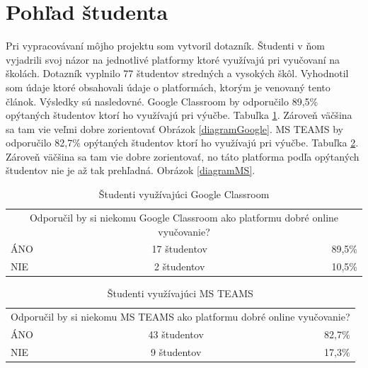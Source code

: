 \documentclass[10pt,slovak,a4paper]{article}
\begin{document}
\section{Pohľad študenta} \label{pohľad studenta}
Pri vypracovávaní môjho projektu som vytvoril dotazník. Študenti v ňom vyjadrili svoj názor na jednotlivé platformy ktoré využívajú pri vyučovaní na školách. Dotazník vyplnilo 77 študentov stredných a vysokých škôl. Vyhodnotil som údaje ktoré obsahovali údaje o platformách, ktorým je venovaný tento článok. Výsledky sú nasledovné. Google Classroom by odporučilo 89,5\% opýtaných študentov ktorí ho využívajú pri výučbe. Tabuľka \ref{tab:tabulkaGoogle}. Zároveň väčšina sa tam vie veľmi dobre zorientovať Obrázok \ref{diagramGoogle}. MS TEAMS by odporučilo 82,7\% opýtaných študentov ktorí ho využívajú pri výučbe. Tabuľka \ref{tab:tabulkaMS}. Zároveň väčšina sa tam vie dobre zorientovať, no táto platforma podľa opýtaných študentov nie je až tak prehľadná.  Obrázok \ref{diagramMS}.


\begin{table}[htbp]
  \centering
  \caption{Študenti využívajúci Google Classroom}
    \begin{tabular}{|l|cc|r|}
    \toprule
    \multicolumn{4}{|c|}{\multirow{2}[2]{*}{Odporučil by si niekomu Google Classroom ako platformu dobré online vyučovanie?}} \\
    \multicolumn{4}{|c|}{} \\
    \midrule
    ÁNO   & \multicolumn{2}{c|}{17 študentov} & 89,5\% \\
    \midrule
    NIE   & \multicolumn{2}{c|}{2 študentov} & 10,5\% \\
    \bottomrule
    \end{tabular}%
  \label{tab:tabulkaGoogle}%
\end{table}%


\begin{table}[htbp]
  \centering
  \caption{Študenti využívajúci MS TEAMS}
    \begin{tabular}{|l|cc|r|}
    \toprule
    \multicolumn{4}{|c|}{\multirow{2}[2]{*}{Odporučil by si niekomu MS TEAMS ako platformu dobré online vyučovanie?}} \\
    \multicolumn{4}{|c|}{} \\
    \midrule
    ÁNO   & \multicolumn{2}{c|}{43 študentov} & 82,7\% \\
    \midrule
    NIE   & \multicolumn{2}{c|}{9 študentov} & 17,3\% \\
    \bottomrule
    \end{tabular}%
  \label{tab:tabulkaMS}%
\end{table}%
\end{document}
